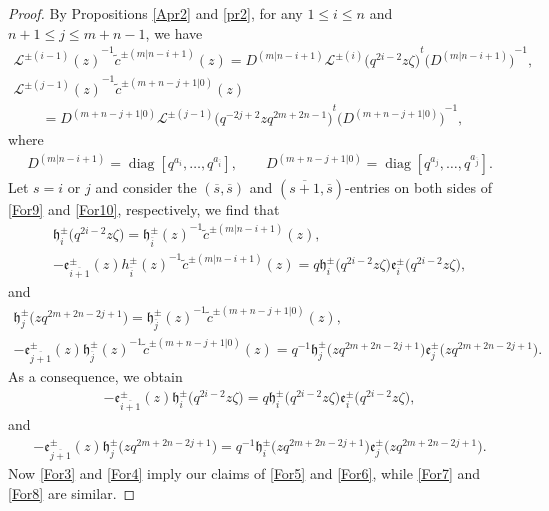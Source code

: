 \documentclass[pdftex]{sigma}
\numberwithin{equation}{section}
\begin{document}
\begin{proof}
By Propositions \ref{Apr2} and \ref{pr2}, for any $1\leq i\leq n$ and $n+1\leq j\leq m+n-1$, we have
\begin{gather}\label{For9}
 {\mathcal{L}^{\pm (i-1)}(z)}^{-1}\widetilde{c}^{\pm (m|n-i+1)}(z)=D^{(m|n-i+1)}{\mathcal{L}^{\pm(i)}\bigl(q^{2i-2}z\zeta\bigr)}^{t}{\bigl(D^{(m|n-i+1)}\bigr)}^{-1},\\
 \label{For10}
 {\mathcal{L}^{\pm (j-1)}(z)}^{-1}\widetilde{c}^{\pm (m+n-j+1|0)}(z)\nonumber\\
 \qquad=D^{(m+n-j+1|0)}{\mathcal{L}^{\pm(j-1)}\bigl(q^{-2j+2}zq^{2m+2n-1}\bigr)}^{t}{\bigl(D^{(m+n-j+1|0)}\bigr)}^{-1},
\end{gather}
where
\begin{gather*}
 D^{(m|n-i+1)}=\operatorname{diag}[q^{a_{i}},\dots,q^{a_{\overline{i}}}],\qquad
 D^{(m+n-j+1|0)}=\operatorname{diag}[q^{a_{j}},\dots,q^{a_{\overline{j}}}].
\end{gather*}Let $s=i$ or $j$ and consider the $(\overline{s},\overline{s})$ and $(\overline{s+1},\overline{s})$-entries on both sides of \eqref{For9} and \eqref{For10}, respectively, we find that
\begin{gather*}
 \mathfrak{h}_i^{\pm}\bigl(q^{2i-2}z\zeta\bigr)={\mathfrak{h}_{\overline{i}}^{\pm}(z)}^{-1}\widetilde{c}^{\pm(m|n-i+1)}(z),\\
 -\mathfrak{e}_{\overline{i+1}}^{\pm}(z){h_{\overline{i}}^{\pm}(z)}^{-1}\widetilde{c}^{\pm(m|n-i+1)}(z)
 =q\mathfrak{h}_i^{\pm}\bigl(q^{2i-2}z\zeta\bigr)\mathfrak{e}_i^{\pm}\bigl(q^{2i-2}z\zeta\bigr),
\end{gather*}
and
\begin{gather*}
 \mathfrak{h}_{j}^{\pm}\bigl(zq^{2m+2n-2j+1}\bigr)={\mathfrak{h}_{\overline{j}}^{\pm}(z)}^{-1}\widetilde{c}^{\pm(m+n-j+1|0)}(z),\\
 -\mathfrak{e}_{\overline{j+1}}^{\pm}(z){\mathfrak{h}_{\overline{j}}^{\pm}(z)}^{-1}\widetilde{c}^{\pm(m+n-j+1|0)}(z)
 =q^{-1}\mathfrak{h}_{j}^{\pm}\bigl(zq^{2m+2n-2j+1}\bigr)\mathfrak{e}_{j}^{\pm}\bigl(zq^{2m+2n-2j+1}\bigr).
\end{gather*}
As a consequence, we obtain
 \begin{gather*}
 -\mathfrak{e}_{\overline{i+1}}^{\pm}(z)\mathfrak{h}_i^{\pm}\bigl(q^{2i-2}z\zeta\bigr)
 =q\mathfrak{h}_i^{\pm}\bigl(q^{2i-2}z\zeta\bigr)\mathfrak{e}_i^{\pm}\bigl(q^{2i-2}z\zeta\bigr),
\end{gather*}and
 \begin{gather*}
 -\mathfrak{e}_{\overline{j+1}}^{\pm}(z)\mathfrak{h}_{j}^{\pm}\bigl(zq^{2m+2n-2j+1}\bigr)
 =q^{-1}\mathfrak{h}_i^{\pm}\bigl(zq^{2m+2n-2j+1}\bigr)\mathfrak{e}_{j}^{\pm}\bigl(zq^{2m+2n-2j+1}\bigr).
\end{gather*}
Now \eqref{For3} and \eqref{For4} imply our claims of \eqref{For5} and \eqref{For6}, while \eqref{For7} and \eqref{For8} are similar.
\end{proof}
\end{document}
